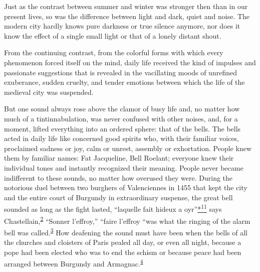 Just as the contrast between summer and winter was stronger then than in
our present lives, so was the difference between light and dark, quiet
and noise. The modern city hardly knows pure darkness or true silence
anymore, nor does it know the effect of a single small light or that of
a lonely distant shout.

From the continuing contrast, from the colorful forms with which every
phenomenon forced itself on the mind, daily life received the kind of
impulses and passionate suggestions that is revealed in the vacillating
moods of unrefined exuberance, sudden cruelty, and tender emotions
between which the life of the medieval city was suspended.

But one sound always rose above the clamor of busy life and, no matter
how much of a tintinnabulation, was never confused with other noises,
and, for a moment, lifted everything into an ordered sphere: that of the
bells. The bells acted in daily life like concerned good spirits who,
with their familiar voices, proclaimed sadness or joy, calm or unrest,
assembly or exhortation. People knew them by familiar names: Fat
Jacqueline, Bell Roelant; everyone knew their individual tones and
instantly recognized their meaning. People never became indifferent to
these sounds, no matter how overused they were. During the notorious
duel between two burghers of Valenciennes in 1455 that kept the city and
the entire court of Burgundy in extraordinary suspense, the great bell
sounded as long as the fight lasted, ``laquelle fait hideux a
oyr''\protect\hypertarget{08_Chapter_One__THE_PASSIONATE_INTE.xhtmlux5cux23id_2303}{\protect\hyperlink{23_NOTES.xhtmlux5cux23id_2304}{*\textsuperscript{11}}}
says
Chastellain,\textsuperscript{\protect\hypertarget{08_Chapter_One__THE_PASSIONATE_INTE.xhtmlux5cux23id_2226}{\protect\hyperlink{23_NOTES.xhtmlux5cux23page_398}{2}}}
``Sonner l'effroy,'' ``faire l'effroy ``was what the ringing of the
alarm bell was
called.\textsuperscript{\protect\hypertarget{08_Chapter_One__THE_PASSIONATE_INTE.xhtmlux5cux23id_2224}{\protect\hyperlink{23_NOTES.xhtmlux5cux23id_2225}{3}}}
How deafening the sound must have been when the bells of all the
churches and cloisters of Paris pealed all day, or even all night,
because a pope had been
\protect\hypertarget{08_Chapter_One__THE_PASSIONATE_INTE.xhtmlux5cux23page_3}{}{}elected
who was to end the schism or because peace had been arranged between
Burgundy and
Armagnac.\textsuperscript{\protect\hypertarget{08_Chapter_One__THE_PASSIONATE_INTE.xhtmlux5cux23id_2222}{\protect\hyperlink{23_NOTES.xhtmlux5cux23id_2223}{4}}}

